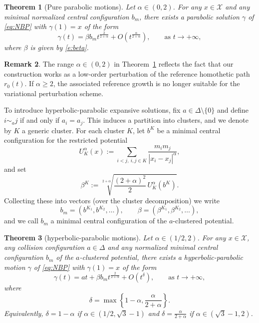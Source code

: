 \documentclass[a4paper,10pt]{amsart}
\theoremstyle{plain}
\newtheorem{thm}{Theorem}
\theoremstyle{definition}
\newtheorem{rem}[thm]{Remark}
\numberwithin{equation}{section}
\numberwithin{thm}{section}
\begin{document}
\begin{thm}[Pure parabolic motions]\label{thm:par_alpha}
Let $\alpha\in(0,2)$. For any $x\in\mathcal{X}$ and any minimal normalized central configuration $b_m$, there exists a parabolic solution $\gamma$ of \eqref{eq:NBP} with $\gamma(1)=x$ of the form
\begin{equation}\label{eq:parabolic}
\gamma(t)=\beta b_m t^{\frac{2}{2+\alpha}}+O\!\left(t^{\frac{\alpha}{2+\alpha}}\right),
\qquad\text{as }t\to+\infty,
\end{equation}
where $\beta$ is given by \eqref{e:beta}.
\end{thm}

\begin{rem}
The range $\alpha\in(0,2)$ in Theorem~\ref{thm:par_alpha} reflects the fact that our construction works as a low-order perturbation of the reference homothetic path $r_0(t)$.
If $\alpha\ge 2$, the associated reference growth is no longer suitable for the variational perturbation scheme.
\end{rem}

\medskip

To introduce hyperbolic-parabolic expansive solutions, fix $a\in\Delta\setminus\{0\}$ and define $i\sim_a j$ if and only if $a_i=a_j$. This induces a partition into clusters, and we denote by $K$ a generic cluster. For each cluster $K$, let $b^K$ be a minimal central configuration for the restricted potential
\[
U^\alpha_K(x):=\sum_{i<j,\ i,j\in K}\frac{m_i m_j}{|x_i-x_j|^\alpha},
\]
and set
\[
\beta^K:=\sqrt[2+\alpha]{\frac{(2+\alpha)^2}{2}\,U^\alpha_K(b^K)}.
\]
Collecting these into vectors (over the cluster decomposition) we write
\begin{equation}\label{e:b_a_cluster}
b_m=(b^{K_1},b^{K_2},\dots),
\qquad
\beta=(\beta^{K_1},\beta^{K_2},\dots),
\end{equation}
and we call $b_m$ a minimal central configuration of the $a$-clustered potential.

\begin{thm}[hyperbolic-parabolic motions]\label{thm:HP_alpha}
Let $\alpha\in(1/2,2)$. For any $x\in\mathcal{X}$, any collision configuration $a\in\Delta$ and any normalized minimal central configuration $b_m$ of the $a$-clustered potential, there exists a hyperbolic-parabolic motion $\gamma$ of \eqref{eq:NBP} with $\gamma(1)=x$ of the form
\begin{equation}\label{eq:hyperbolic_parabolic}
\gamma(t)=at+\beta b_m t^{\frac{2}{2+\alpha}}+O(t^\delta),
\qquad\text{as }t\to+\infty,
\end{equation}
where
\[
\delta=\max\left\{1-\alpha,\frac{\alpha}{2+\alpha}\right\}.
\]
Equivalently, $\delta=1-\alpha$ if $\alpha\in(1/2,\sqrt{3}-1)$ and $\delta=\frac{\alpha}{2+\alpha}$ if $\alpha\in(\sqrt{3}-1,2)$.
\end{thm}
\end{document}
